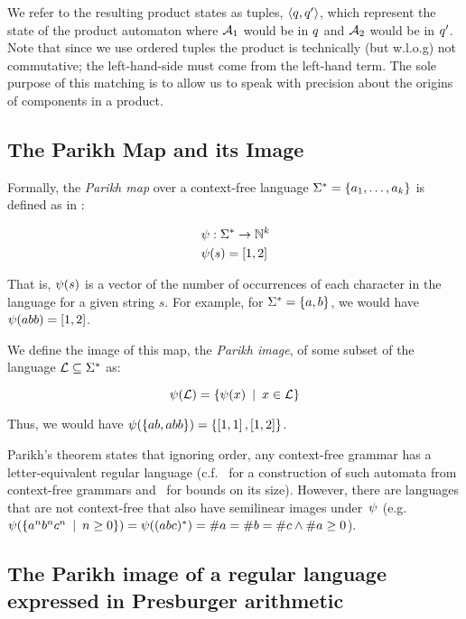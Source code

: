 \documentclass[acmsmall,review,anonymous]{acmart}\settopmatter{printfolios=true,printccs=false,printacmref=true}
\theoremstyle{definition}
\begin{document}
We refer to the resulting product states as tuples, $\Tuple{\State, \State'}$,
which represent the state of the product automaton where $\Automaton_1$ would be
in $\State$ and $\Automaton_2$ would be in $\State'$. Note that since we use
ordered tuples the product is technically (but w.l.o.g) not commutative; the
left-hand-side must come from the left-hand term. The sole purpose of this
matching is to allow us to speak with precision about the origins of components
in a product.

\subsection{The Parikh Map and its Image}
Formally, the \textit{Parikh map} over a context-free language $\Strings=
\left\{a_1, \ldots, a_k \right\}$ is defined as in \cite{kozen}:

$$
\begin{aligned}
& \ParikhMap: \MapFromTo{\Strings}{\natural^k} \\
& \ParikhMap(s) = \VectorLiteral{\#a_1(s), \#a_2(s), \ldots, \#a_k(s)}
\end{aligned}
$$

That is, $\ParikhMap(s)$ is a vector of the number of occurrences of each
character in the language for a given string $s$. For example, for  $\Strings =
\Set{a, b}$, we would have $\ParikhMap(abb) = \VectorLiteral{1, 2}$.

We define the image of this map, the \textit{Parikh image}, of some subset of
the language $\Language \subseteq \Strings$ as:

\[
\ParikhMap(\Language) = \Set{\ParikhMap(x) \SuchThat x \in \Language}
\]

Thus, we would have $\ParikhMap(\left\{ab, abb\right\}) = \left\{\left[1,
1\right], \left[1, 2\right]\right\}$.

Parikh's theorem states that ignoring order, any context-free grammar has a
letter-equivalent regular language (c.f.~\cite{construction} for a construction of
such automata from context-free grammars and~\cite{bounds} for bounds on its size). However, there are languages that are
not context-free that also have semilinear images under~$\ParikhMap$ (e.g.
$\ParikhMap(\Set{a^nb^nc^n \SuchThat n \geq 0}) = \ParikhMap((abc)^*) = \#a =
\#b = \#c \land \#a \geq 0$).

\subsection{The Parikh image of a regular language expressed in Presburger arithmetic}
\end{document}
